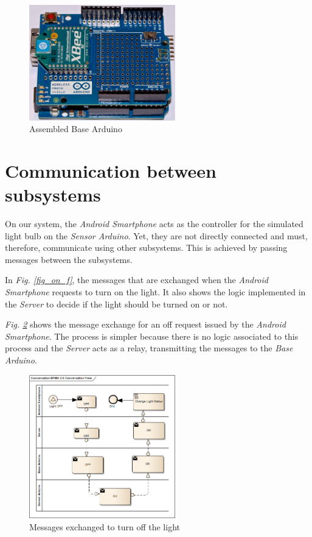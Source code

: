 \documentclass[conference, a4paper]{IEEEtran}
\begin{document}
\begin{figure}[H]
\centering
\includegraphics[width=2.5in]{Server_Arduino}
\caption{Assembled Base Arduino}
\label{fig_b_ard}
\end{figure}

\section{Communication between subsystems}

On our system, the \textit{Android Smartphone} acts as the controller for the simulated light bulb on the \textit{Sensor Arduino}. Yet, they are not directly connected and must, therefore, communicate using other subsystems. This is achieved by passing messages between the subsystems.

In \textit{Fig. \ref{fig_on_f}}, the messages that are exchanged when the \textit{Android Smartphone} requests to turn on the light. It also shows the logic implemented in the \textit{Server} to decide if the light should be turned on or not.

\textit{Fig. \ref{fig_off_f}} shows the message exchange for an off request issued by the \textit{Android Smartphone}. The process is simpler because there is no logic associated to this process and the \textit{Server} acts as a relay, transmitting the messages to the \textit{Base Arduino}.

\begin{figure}[H]
\centering
\includegraphics[width=2.5in]{OFF_Flow}
\caption{Messages exchanged to turn off the light}
\label{fig_off_f}
\end{figure}
\end{document}
